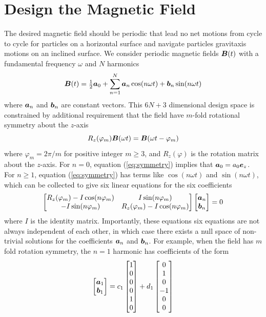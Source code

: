  \section{Design the Magnetic Field}
 The desired magnetic field should be periodic that lead no net motions from cycle to cycle for particles on a horizontal surface and navigate particles gravitaxis motions on an inclined surface.
 We consider periodic magnetic fields $\boldsymbol{B}(t)$ with a fundamental frequency $\omega$ and $N$ harmonics
\begin{equation}
    \boldsymbol{B}(t) = \tfrac{1}{2} \boldsymbol{a}_0 + \sum_{n=1}^N \boldsymbol{a}_n \cos(n\omega t) + \boldsymbol{b}_n \sin(n\omega t)
\end{equation}
where $\boldsymbol{a}_n$ and $\boldsymbol{b}_n$ are constant vectors. This $6N+3$ dimensional design space is constrained by additional requirement that the field have $m$-fold rotational symmetry about the $z$-axis
\begin{equation}
    R_z(\varphi_m) \boldsymbol{B}(\omega t) = \boldsymbol{B}(\omega t - \varphi_m) \label{eq:symmetry}
\end{equation}
where $\varphi_m=2\pi/m$ for positive integer $m\geq 3$, and $R_z(\varphi)$ is the rotation matrix about the $z$-axis.
For $n=0$, equation (\ref{eq:symmetry}) implies that $\boldsymbol{a}_0 = a_0 \boldsymbol{e}_z$. For $n\geq1$, equation (\ref{eq:symmetry}) has terms like $\cos(n \omega t)$ and $\sin(n\omega t)$, which can be collected to give six linear equations for the six coefficients 
\begin{equation}
    \begin{bmatrix} 
    R_z(\varphi_m) - I \cos(n\varphi_m) & I \sin(n \varphi_m) \\
    -I \sin(n \varphi_m) & R_z(\varphi_m) - I \cos(n\varphi_m)
    \end{bmatrix} 
    \begin{bmatrix} \boldsymbol{a}_n \\ \boldsymbol{b}_n \end{bmatrix} = 0
\end{equation}
where $I$ is the identity matrix.  Importantly, these equations six equations are not always independent of each other, in which case there exists a null space of non-trivial solutions for the coefficients $\boldsymbol{a}_n$ and $\boldsymbol{b}_n$.  For example, when the field has $m$ fold rotation symmetry, the $n=1$ harmonic has coefficients of the form 
\begin{equation}
    \begin{bmatrix} \boldsymbol{a}_1 \\ \boldsymbol{b}_1 \end{bmatrix} = c_1 \begin{bmatrix} 1\\0\\0\\0\\1\\0 \end{bmatrix} + d_1 \begin{bmatrix} 0\\1\\0\\-1\\0\\0 \end{bmatrix}
\end{equation}
